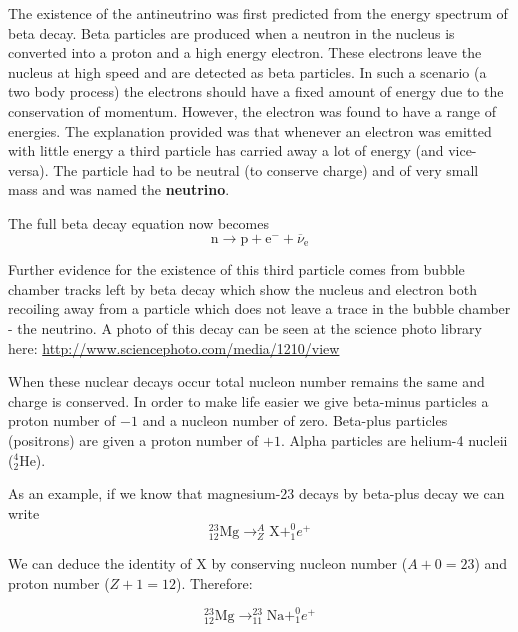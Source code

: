 \documentclass[main.tex]{subfiles}
\begin{document}

The existence of the antineutrino was first predicted from the energy spectrum of beta decay. Beta particles are produced when a neutron in the nucleus is converted into a proton and a high energy electron. These electrons leave the nucleus at high speed and are detected as beta particles. In such a scenario (a two body process) the electrons should have a fixed amount of energy due to the conservation of momentum. However, the electron was found to have a range of energies. The explanation provided was that whenever an electron was emitted with little energy a third particle has carried away a lot of energy (and vice-versa). The particle had to be neutral (to conserve charge) and of very small mass and was named the \textbf{neutrino}.

The full beta decay equation now becomes
\[ \text{n} \rightarrow \text{p} + \text{e}^- + \overline{\nu}_\text{e} \]

Further evidence for the existence of this third particle comes from bubble chamber tracks left by beta decay which show the nucleus and electron both recoiling away from a particle which does not leave a trace in the bubble chamber - the neutrino. A photo of this decay can be seen at the science photo library here: \url{http://www.sciencephoto.com/media/1210/view}


When these nuclear decays occur total nucleon number remains the same and charge is conserved. In order to make life easier we give beta-minus particles a proton number of $-1$ and a nucleon number of zero. Beta-plus particles (positrons) are given a proton number of $+1$. Alpha particles are helium-4 nucleii ($_2^4\text{He}$).

As an example, if we know that magnesium-23 decays by beta-plus decay we can write
\[ _{12}^{23}\text{Mg} \rightarrow _Z^A\text{X} + _{1}^{0}e^+ \]

We can deduce the identity of X by conserving nucleon number ($A+0=23$) and proton number ($Z+1 = 12$). Therefore:

\[ _{12}^{23}\text{Mg} \rightarrow _{11}^{23}\text{Na} + _{1}^{0}e^+ \]

\end{document}
